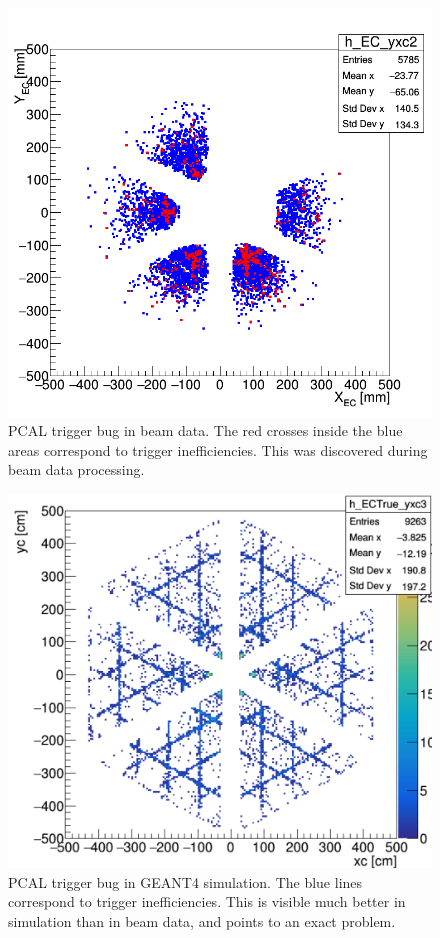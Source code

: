 \begin{figure}[hbt]
	\centering
	\includegraphics[width=1.0\columnwidth,keepaspectratio]{img/PCAL_bug_data.png}
	\caption{PCAL trigger bug in beam data. The red crosses inside the blue areas correspond to trigger inefficiencies. This was discovered during beam data processing.}
	\label{fig:PCAL_bug_data}
\end{figure}

\begin{figure}[hbt]
	\centering
	\includegraphics[width=1.0\columnwidth,keepaspectratio]{img/PCAL_bug_hls.png}
	\caption{PCAL trigger bug in GEANT4 simulation. The blue lines correspond to trigger inefficiencies. This is visible much better in simulation than in beam data, and points to an exact problem.}
	\label{fig:PCAL_bug_hls}
\end{figure}


